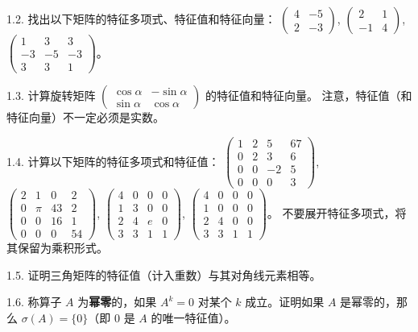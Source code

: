 1.2. 找出以下矩阵的特征多项式、特征值和特征向量：
$\begin{pmatrix} 4 & -5 \\ 2 & -3 \end{pmatrix}$, $\begin{pmatrix} 2 & 1 \\ -1 & 4 \end{pmatrix}$, $\begin{pmatrix} 1 & 3 & 3 \\ -3 & -5 & -3 \\ 3 & 3 & 1 \end{pmatrix}$。

1.3. 计算旋转矩阵 $\begin{pmatrix} \cos \alpha & -\sin \alpha \\ \sin \alpha & \cos \alpha \end{pmatrix}$ 的特征值和特征向量。
注意，特征值（和特征向量）不一定必须是实数。

1.4. 计算以下矩阵的特征多项式和特征值：
$\begin{pmatrix} 1 & 2 & 5 & 67 \\ 0 & 2 & 3 & 6 \\ 0 & 0 & -2 & 5 \\ 0 & 0 & 0 & 3 \end{pmatrix}$, $\begin{pmatrix} 2 & 1 & 0 & 2 \\ 0 & \pi & 43 & 2 \\ 0 & 0 & 16 & 1 \\ 0 & 0 & 0 & 54 \end{pmatrix}$, $\begin{pmatrix} 4 & 0 & 0 & 0 \\ 1 & 3 & 0 & 0 \\ 2 & 4 & e & 0 \\ 3 & 3 & 1 & 1 \end{pmatrix}$, $\begin{pmatrix} 4 & 0 & 0 & 0 \\ 1 & 0 & 0 & 0 \\ 2 & 4 & 0 & 0 \\ 3 & 3 & 1 & 1 \end{pmatrix}$。
不要展开特征多项式，将其保留为乘积形式。

1.5. 证明三角矩阵的特征值（计入重数）与其对角线元素相等。

1.6. 称算子 $A$ 为\textbf{幂零}的，如果 $A^k = 0$ 对某个 $k$ 成立。证明如果 $A$ 是幂零的，那么 $\sigma(A) = \{0\}$（即 $0$ 是 $A$ 的唯一特征值）。

